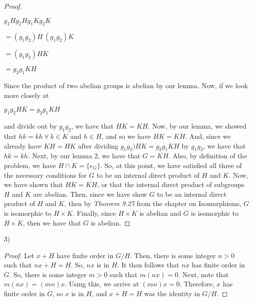 \documentclass[executivepaper]{article}
\begin{document}
\begin{flushleft}
\begin{proof}
\begin{center}

$g_{1}Hg_{2}Hg_{1}Kg_{2}K$

\vspace{2mm}

$=(g_{1}g_{2})H ~ (g_{1}g_{2})K$

\vspace{2mm}

$=(g_{1}g_{2})HK$

\vspace{2mm}

$=g_{2}g_{1}KH$

\end{center}

Since the product of two abelian groups is abelian by our lemma. Now, if we look more closely at

\begin{center}

$g_{1}g_{2}HK=g_{2}g_{1}KH$

\end{center}

and divide out by $g_{1}g_{2}$, we have that $HK=KH$. Now, by our lemma, we showed that $hk=kh ~ \forall ~ k \in K$ and $h \in H$, and so we have $HK=KH$. And, since we already have $KH=HK$ after dividing $g_{1}g_{2})HK=g_{2}g_{1}KH$ by $g_{1}g_{2}$, we have that $hk=kh$. Next, by our lemma 2, we have that $G=KH$. Also, by definition of the problem, we have $H \cap K=\{e_{G}\}$. So, at this point, we have satisfied all three of the necessary conditions for $G$ to be an internal direct product of $H$ and $K$. Now, we have shown that $HK=KH$, or that the internal direct product of subgroups $H$ and $K$ are abelian. Then, since we have show $G$ to be an internal direct product of $H$ and $K$, then by \textit{Theorem 9.27} from the chapter on Isomorphisms, $G$ is isomorphic to $H \times K$. Finally, since $H \times K$ is abelian and $G$ is isomorphic to $H \times K$, then we have that $G$ is abelian.

\end{proof}

\end{flushleft}

\begin{flushleft}

3)

\begin{proof}

Let $x+H$ have finite order in $G/H$. Then, there is some integer $n > 0$ such that $nx+H=H$. So, $nx$ is in $H$. It then follows that $nx$ has finite order in $G$. So, there is some integer $m > 0$ such that $m(nx)=0$. Next, note that $m(nx)=(mn)x$. Using this, we arrive at $(mn)x=0$. Therefore, $x$ has finite order in $G$, so $x$ is in $H$, and $x+H=H$ was the identity in $G/H$.

\end{proof}

\end{flushleft}
\end{document}
